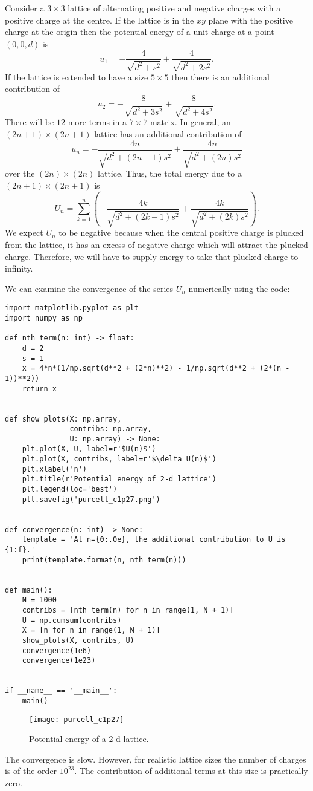 \documentclass{article}
\begin{document}
\begin{enumerate}
Consider a $3 \times 3$ lattice of alternating positive and negative charges
with a positive charge at the centre. If the lattice is in the $xy$ plane with the
positive charge at the origin then the potential energy of a unit charge at a point
$(0, 0, d)$ is
\[
u_1 = -\frac{4}{\sqrt{d^2 + s^2}} + \frac{4}{\sqrt{d^2 + 2s^2}}.
\]
If the lattice is extended to have a size $5 \times 5$  then there is an additional
contribution of
\[
u_2 = -\frac{8}{\sqrt{d^2 + 3s^2}} + \frac{8}{\sqrt{d^2 + 4s^2}}.
\]
There will be $12$ more terms in a $7 \times 7$ matrix. In general, an $(2n + 1) 
\times (2n + 1)$ lattice has an additional contribution
of 
\[
u_n =  -\frac{4n}{\sqrt{d^2 + (2n - 1)s^2}} + \frac{4n}{\sqrt{d^2 + (2n)s^2}}
\]
over the $(2n) \times (2n)$ lattice. Thus, the total energy due to a $(2n + 1) 
\times (2n + 1)$ is
\[
U_n = \sum_{k=1}^n\left(-\frac{4k}{\sqrt{d^2 + (2k - 1)s^2}} + 
                        \frac{4k}{\sqrt{d^2 + (2k)s^2}}\right).
\]
We expect $U_n$ to be negative because when the central positive charge is plucked
from the lattice, it has an excess of negative charge which will attract the 
plucked charge. Therefore, we will have to supply energy to take that plucked charge to
infinity.

We can examine the convergence of the series $U_n$ numerically using the code:
\begin{verbatim}
import matplotlib.pyplot as plt
import numpy as np

def nth_term(n: int) -> float:
    d = 2
    s = 1
    x = 4*n*(1/np.sqrt(d**2 + (2*n)**2) - 1/np.sqrt(d**2 + (2*(n - 1))**2))
    return x


def show_plots(X: np.array,
               contribs: np.array,
               U: np.array) -> None:
    plt.plot(X, U, label=r'$U(n)$')
    plt.plot(X, contribs, label=r'$\delta U(n)$')    
    plt.xlabel('n')
    plt.title(r'Potential energy of 2-d lattice')
    plt.legend(loc='best')
    plt.savefig('purcell_c1p27.png')


def convergence(n: int) -> None:
    template = 'At n={0:.0e}, the additional contribution to U is {1:f}.'
    print(template.format(n, nth_term(n)))


def main():
    N = 1000
    contribs = [nth_term(n) for n in range(1, N + 1)]
    U = np.cumsum(contribs)
    X = [n for n in range(1, N + 1)]
    show_plots(X, contribs, U)
    convergence(1e6)
    convergence(1e23)
    

if __name__ == '__main__':
    main()
\end{verbatim}
\begin{figure}[!ht]
\center
\texttt{[image: purcell\_c1p27]}
\caption{Potential energy of a 2-d lattice.}
\label{c1f2}
\end{figure}
The convergence is slow. However, for realistic lattice sizes the number of charges
is of the order $10^{23}$. The contribution of additional terms at this size is 
practically zero.


\end{enumerate}
\end{document}

